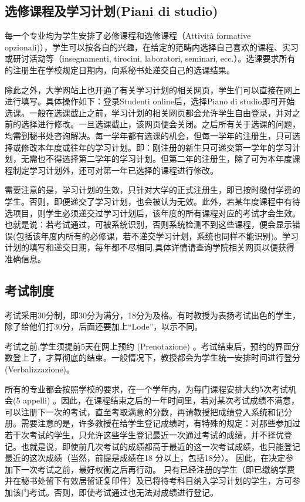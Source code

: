 \subsection{选修课程及学习计划(Piani di studio)}
每一个专业均为学生安排了必修课程和选修课程（Attività formative opzionali)），学生可以按各自的兴趣，在给定的范畴内选择自己喜欢的课程、实习或研讨活动等（insegnamenti, tirocini, laboratori, seminari, ecc.）。选课要求所有的注册生在学校规定日期内，向系秘书处递交自己的选课结果。

除此之外，大学网站上也开通了有关学习计划的相关网页，学生们可以直接在网上进行填写。具体操作如下：登录Studenti online后，选择Piano di studio即可开始选课。一般在选课截止之前，学习计划的相关网页都会允许学生自由登录，并对之前的选择进行修改。一旦选课截止，该网页便会关闭。之后所有关于选课的问题，均需到秘书处咨询解决。每一学年都有选课的机会，但每一学年的注册生，只可选择或修改本年度或往年的学习计划。即：刚注册的新生只可递交第一学年的学习计划，无需也不得选择第二学年的学习计划。但第二年的注册生，除了可为本年度课程制定学习计划外，还可对第一年已选择的课程进行修改。

需要注意的是，学习计划的生效，只针对大学的正式注册生，即已按时缴付学费的学生。否则，即便递交了学习计划，也会被认为无效。此外，若某年度课程中有待选项目，则学生必须递交过学习计划后，该年度的所有课程对应的考试才会生效。也就是说：若考试通过，可被系统识别，否则系统检测不到这些课程，便会显示错误(包括该年度内所有的必修课，若不递交学习计划，系统也同样不能识别)。学习计划的填写和递交日期，每年都不尽相同,具体详情请查询学院相关网页以便获得准确信息。 

\subsection{考试制度}
考试采用30分制，即30分为满分，18分为及格。有时教授为表扬考试出色的学生，除了给他们打30分，后面还要加上“Lode”，以示不同。


考试之前,学生须提前5天在网上预约 (Prenotazione) 。考试结束后，预约的界面分数登上了，才算彻底的结束。一般情况下，教授都会为学生统一安排时间进行登分(Verbalizzazione)。


所有的专业都会按照学校的要求，在一个学年内，为每门课程安排大约5次考试机会(5 appelli) 。因此，在课程结束之后的一年时间里，若对某次考试成绩不满意，可以注册下一次的考试，直至考取满意的分数，再请教授把成绩登入系统和记分册。需要注意的是，许多教授在给学生登记成绩时，有特殊的规定：对那些参加过若干次考试的学生，只允许这些学生登记最近一次通过考试的成绩，并不择优登记。也就是说，即使前几次考试的成绩都高于最近的这一次考试成绩，也只能登记最近的这次成绩（当然，前提是成绩在18 分以上，包括18分）。 因此，在决定参加下一次考试之前，最好权衡之后再行动。 只有已经注册的学生（即已缴纳学费并在秘书处留下有效居留证复印件）及已将待考科目纳入学习计划的学生，方可参加该门考试。否则，即使考试通过也无法对成绩进行登记。 


